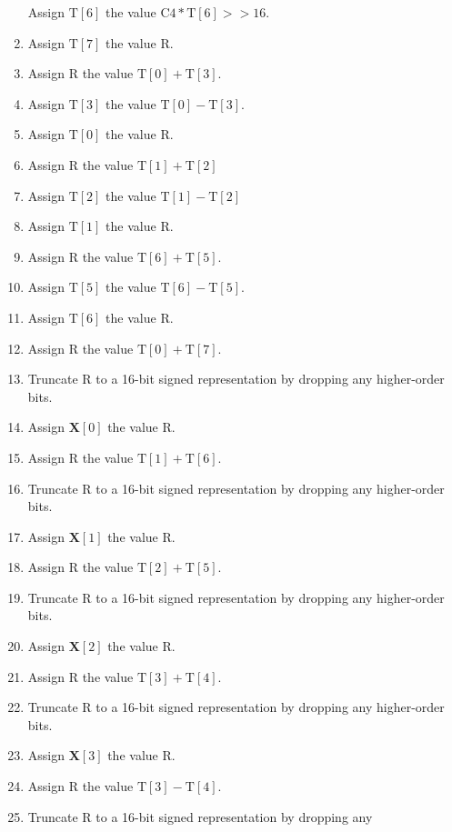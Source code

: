 \documentclass[9pt,letterpaper]{book}
\newcommand{\bitvar}[1]{\ensuremath{\mathbf{\bm{#1}}}}
\newcommand{\locvar}[1]{\ensuremath{\mathrm{#1}}}
\numberwithin{equation}{chapter}
\numberwithin{figure}{chapter}
\numberwithin{table}{chapter}
\begin{document}
\begin{enumerate}
Assign $\locvar{T}[6]$ the value $\locvar{C4}*\locvar{T}[6]>>16$.
\item
Assign $\locvar{T}[7]$ the value $\locvar{R}$.
\item
Assign \locvar{R} the value $\locvar{T}[0]+\locvar{T}[3]$.
\item
Assign $\locvar{T}[3]$ the value $\locvar{T}[0]-\locvar{T}[3]$.
\item
Assign $\locvar{T}[0]$ the value \locvar{R}.
\item
Assign \locvar{R} the value $\locvar{T}[1]+\locvar{T}[2]$
\item
Assign $\locvar{T}[2]$ the value $\locvar{T}[1]-\locvar{T}[2]$
\item
Assign $\locvar{T}[1]$ the value \locvar{R}.
\item
Assign \locvar{R} the value $\locvar{T}[6]+\locvar{T}[5]$.
\item
Assign $\locvar{T}[5]$ the value $\locvar{T}[6]-\locvar{T}[5]$.
\item
Assign $\locvar{T}[6]$ the value \locvar{R}.
\item
Assign \locvar{R} the value $\locvar{T}[0]+\locvar{T}[7]$.
\item
Truncate \locvar{R} to a 16-bit signed representation by dropping any
 higher-order bits.
\item
Assign $\bitvar{X}[0]$ the value \locvar{R}.
\item
Assign \locvar{R} the value $\locvar{T}[1]+\locvar{T}[6]$.
\item
Truncate \locvar{R} to a 16-bit signed representation by dropping any
 higher-order bits.
\item
Assign $\bitvar{X}[1]$ the value \locvar{R}.
\item
Assign \locvar{R} the value $\locvar{T}[2]+\locvar{T}[5]$.
\item
Truncate \locvar{R} to a 16-bit signed representation by dropping any
 higher-order bits.
\item
Assign $\bitvar{X}[2]$ the value \locvar{R}.
\item
Assign \locvar{R} the value $\locvar{T}[3]+\locvar{T}[4]$.
\item
Truncate \locvar{R} to a 16-bit signed representation by dropping any
 higher-order bits.
\item
Assign $\bitvar{X}[3]$ the value \locvar{R}.
\item
Assign \locvar{R} the value $\locvar{T}[3]-\locvar{T}[4]$.
\item
Truncate \locvar{R} to a 16-bit signed representation by dropping any

\end{enumerate}
\end{document}
